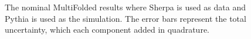 \begin{figure}[h!]
\caption{The nominal MultiFolded results where Sherpa is used as data and Pythia is used as the simulation. The error bars represent the total uncertainty, which each component added in quadrature.}
\label{fig:simresultsmulti_nominal}
\end{figure}

